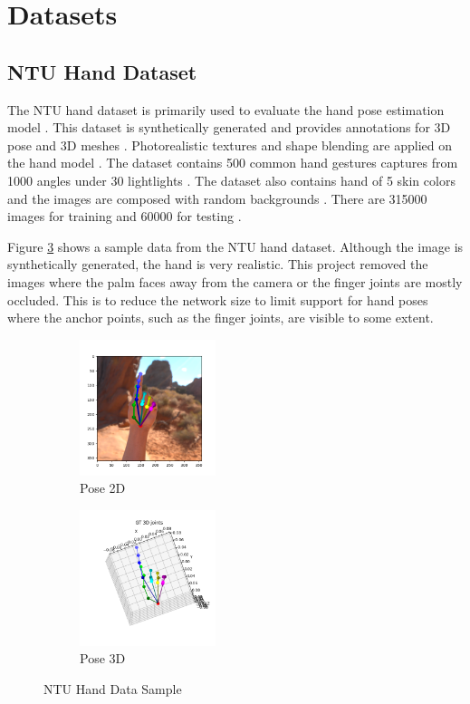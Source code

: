 \section{Datasets}
\subsection{NTU Hand Dataset}
\noindent
The NTU hand dataset is primarily used to evaluate the hand pose estimation model \cite{handgcn}. This dataset is synthetically generated and provides annotations for 3D pose and 3D meshes \cite{handgcn}. Photorealistic textures and shape blending are applied on the hand model \cite{handgcn}. The dataset contains 500 common hand gestures captures from 1000 angles under 30 lightlights \cite{handgcn}. The dataset also contains hand of 5 skin colors and the images are composed with random backgrounds \cite{handgcn}. There are 315000 images for training and 60000 for testing \cite{handgcn}. 

\noindent
Figure \ref{fig:ntu_sample_data} shows a sample data from the NTU hand dataset. Although the image is synthetically generated, the hand is very realistic. This project removed the images where the palm faces away from the camera or the finger joints are mostly occluded. This is to reduce the network size to limit support for hand poses where the anchor points, such as the finger joints, are visible to some extent. 

\begin{figure}[ht]
    \begin{center}
        \begin{subfigure}[b]{0.35\textwidth}
            \includegraphics[width=150px]{assets/ntu_pose_2d.png}
            \caption{Pose 2D}
            \label{fig:ntu_pose_2d}
        \end{subfigure}
        \begin{subfigure}[b]{0.35\textwidth}
            \includegraphics[width=150px]{assets/ntu_pose_3d.png}
            \caption{Pose 3D}
            \label{fig:ntu_pose_3d}
        \end{subfigure}
	    \caption{NTU Hand Data Sample}
	    \label{fig:ntu_sample_data}        
    \end{center}
\end{figure}

